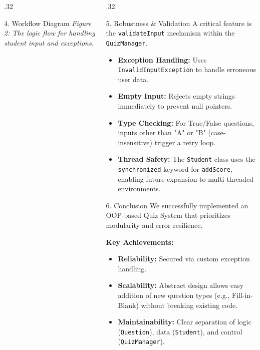 \documentclass[final]{beamer}
\begin{document}
\begin{frame}[t]
\begin{columns}[T]
\begin{column}{.32\paperwidth}
\begin{block}{4. Workflow Diagram}
      \textit{Figure 2: The logic flow for handling student input and exceptions.}
    \end{block}

  \end{column}

  \begin{column}{.32\paperwidth}

    \begin{block}{5. Robustness \& Validation}
       A critical feature is the \texttt{validateInput} mechanism within the \texttt{QuizManager}.
       
       \begin{itemize}
           \item \textbf{Exception Handling:} Uses \texttt{InvalidInputException} to handle erroneous user data.
           \item \textbf{Empty Input:} Rejects empty strings immediately to prevent null pointers.
           \item \textbf{Type Checking:} For True/False questions, inputs other than "A" or "B" (case-insensitive) trigger a retry loop.
           \item \textbf{Thread Safety:} The \texttt{Student} class uses the \texttt{synchronized} keyword for \texttt{addScore}, enabling future expansion to multi-threaded environments.
       \end{itemize}
    \end{block}

    \begin{block}{6. Conclusion}
      We successfully implemented an OOP-based Quiz System that prioritizes modularity and error resilience.
      
      \vspace{0.5em}
      \textbf{Key Achievements:}
      \begin{itemize}
          \item \textbf{Reliability:} Secured via custom exception handling.
          \item \textbf{Scalability:} Abstract design allows easy addition of new question types (e.g., Fill-in-Blank) without breaking existing code.
          \item \textbf{Maintainability:} Clear separation of logic (\texttt{Question}), data (\texttt{Student}), and control (\texttt{QuizManager}).
      \end{itemize}
    \end{block}


\end{column}
\end{columns}
\end{frame}
\end{document}
